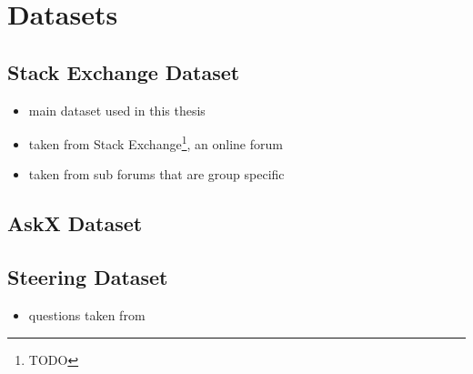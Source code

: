 \chapter{Datasets}%
\label{sec:datasets}

\section{Stack Exchange Dataset}%
\label{sec:datasets:stackex}

\begin{itemize}
  \item main dataset used in this thesis
  \item taken from Stack Exchange\footnote{TODO}, an online forum
  \item taken from sub forums that are group specific
\end{itemize}

\section{AskX Dataset}%
\label{sec:datasets:askx}


\section{Steering Dataset}%
\label{sec:datasets:steering}
\begin{itemize}
  \item questions taken from \citet{petroni-etal-2021-kilt,rooeinKnowYourAudience2023}
\end{itemize}

